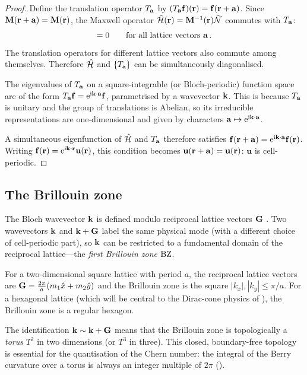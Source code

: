 \begin{proof}
Define the translation operator $T_{\mathbf{a}}$ by
$(T_{\mathbf{a}}\mathbf{f})(\mathbf{r})=\mathbf{f}(\mathbf{r}+\mathbf{a})$.  Since
$\mathbf{M}(\mathbf{r}+\mathbf{a})=\mathbf{M}(\mathbf{r})$, the Maxwell operator
$\hat{\mathcal{H}}(\mathbf{r})=\mathbf{M}^{-1}(\mathbf{r})\hat{\mathcal{N}}$ commutes with $T_{\mathbf{a}}$:
\begin{equation}
  [T_\avec,\,\Hamop] = 0
  \qquad\text{for all lattice vectors } \avec\,.
\end{equation}
The translation operators for different lattice vectors also commute
among themselves.  Therefore $\hat{\mathcal{H}}$ and $\{T_{\mathbf{a}}\}$ can be
simultaneously diagonalised.

The eigenvalues of $T_{\mathbf{a}}$ on a square-integrable (or Bloch-periodic)
function space are of the form
$T_{\mathbf{a}}\mathbf{f}=\mathrm{e}^{\mathrm{i}\mathbf{k}\cdot\mathbf{a}}\mathbf{f}$,
parametrised by a wavevector $\mathbf{k}$.  This is because $T_{\mathbf{a}}$ is
unitary and the group of translations is Abelian, so its irreducible
representations are one-dimensional and given by characters
$\mathbf{a}\mapsto\mathrm{e}^{\mathrm{i}\mathbf{k}\cdot\mathbf{a}}$.

A simultaneous eigenfunction of $\hat{\mathcal{H}}$ and $T_{\mathbf{a}}$ therefore
satisfies $\mathbf{f}(\mathbf{r}+\mathbf{a})=\mathrm{e}^{\mathrm{i}\mathbf{k}\cdot\mathbf{a}}\mathbf{f}(\mathbf{r})$.
Writing $\mathbf{f}(\mathbf{r})=\mathrm{e}^{\mathrm{i}\mathbf{k}\cdot\mathbf{r}}\mathbf{u}(\mathbf{r})$,
this condition becomes $\mathbf{u}(\mathbf{r}+\mathbf{a})=\mathbf{u}(\mathbf{r})$:
$\mathbf{u}$ is cell-periodic.
\end{proof}

\subsection{The Brillouin zone}
\label{sec:ch4-bz}

The Bloch wavevector $\mathbf{k}$ is defined modulo reciprocal lattice
vectors $\mathbf{G}$
\cite{initio2026pdf}.  Two wavevectors $\mathbf{k}$ and $\mathbf{k}+\mathbf{G}$ label the
same physical mode (with a different choice of cell-periodic part), so
$\mathbf{k}$ can be restricted to a fundamental domain of the reciprocal
lattice---the \emph{first Brillouin zone} $\mathrm{BZ}$.

For a two-dimensional square lattice with period $a$, the reciprocal
lattice vectors are $\mathbf{G}=\frac{2\pi}{a}(m_1\hat{x}+m_2\hat{y})$ and
the Brillouin zone is the square
$|k_x|,|k_y|\leq\pi/a$.  For a hexagonal lattice (which will be
central to the Dirac-cone physics of ), the
Brillouin zone is a regular hexagon.

\begin{remark}
  The identification $\mathbf{k}\sim\mathbf{k}+\mathbf{G}$ means that the Brillouin
  zone is topologically a \emph{torus} $T^2$ in two dimensions (or
  $T^3$ in three).  This closed, boundary-free topology is essential
  for the quantisation of the Chern number: the integral of the Berry
  curvature over a torus is always an integer multiple of $2\pi$
  ().
\end{remark}

